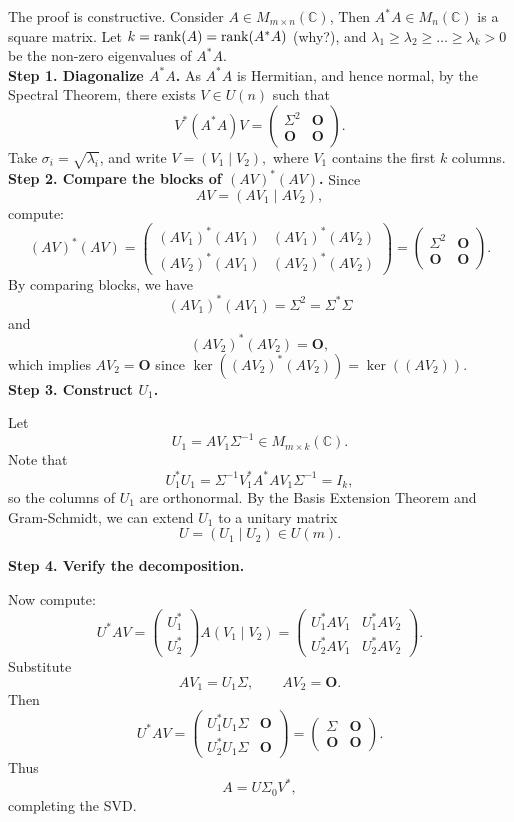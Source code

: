 \begin{pfbox}
The proof is constructive.
Consider $A\in M_{m\times n}(\mathbb{C})$,
Then $A^*A\in M_n(\mathbb{C})$ is a square matrix.
Let $k=\operatorname{rank}(A)=\operatorname{rank}(A^*A)$ (why?), 
and $\lambda_1\ge \lambda_2\ge \dots\ge \lambda_k>0$
be the non-zero eigenvalues of $A^*A$.\\

\textbf{Step 1. Diagonalize $A^*A$.}
As $A^*A$ is Hermitian, and hence normal, by the Spectral Theorem, there exists
$V\in U(n)$ such that
\[
V^*(A^*A)V
=
\begin{pmatrix}
\Sigma^2 & \mathbf{O} \\
\mathbf{O} & \mathbf{O}
\end{pmatrix}.
\]
Take $\sigma_i=\sqrt{\lambda_i}$, and write $V=(V_1\mid V_2),$
where $V_1$ contains the first $k$ columns.\\

\textbf{Step 2. Compare the blocks of $(AV)^*(AV)$.}
Since
\[
AV=(AV_1\mid AV_2),
\]
compute:
\[
(AV)^*(AV)
=
\begin{pmatrix}
(AV_1)^*(AV_1) & (AV_1)^*(AV_2) \\
(AV_2)^*(AV_1) & (AV_2)^*(AV_2)
\end{pmatrix}
=
\begin{pmatrix}
\Sigma^2 & \mathbf{O} \\
\mathbf{O} & \mathbf{O}
\end{pmatrix}.
\]
By comparing blocks, we have
\[(AV_1)^*(AV_1)=\Sigma^2 = \Sigma^*\Sigma\] 
and
\[(AV_2)^*(AV_2)=\mathbf{O},\] 
which implies $AV_2=\mathbf{O}$ since $\ker((AV_2)^*(AV_2))=\ker((AV_2))$.\\

\textbf{Step 3. Construct $U_1$.}

Let
\[
U_1=AV_1\Sigma^{-1}\in M_{m\times k}(\mathbb{C}).
\]
Note that
\[
U_1^*U_1
=
\Sigma^{-1}V_1^*A^*AV_1\Sigma^{-1}
=
I_k,
\]
so the columns of $U_1$ are orthonormal.
By the Basis Extension Theorem and Gram-Schmidt, we can extend $U_1$ to a unitary
matrix
\[
U=(U_1\mid U_2)\in U(m).
\]

\textbf{Step 4. Verify the decomposition.}

Now compute:
\[
U^*AV
=
\begin{pmatrix}
U_1^*\\
U_2^*
\end{pmatrix}
A(V_1\mid V_2)
=
\begin{pmatrix}
U_1^*AV_1 & U_1^*AV_2 \\
U_2^*AV_1 & U_2^*AV_2
\end{pmatrix}.
\]
Substitute
\[
AV_1=U_1\Sigma,
\qquad
AV_2=\mathbf{O}.
\]
Then
\[
U^*AV
=
\begin{pmatrix}
U_1^*U_1\Sigma & \mathbf{O} \\
U_2^*U_1\Sigma & \mathbf{O}
\end{pmatrix}
=
\begin{pmatrix}
\Sigma & \mathbf{O} \\
\mathbf{O} & \mathbf{O}
\end{pmatrix}.
\]
Thus
\[
A=U\Sigma_0V^*,
\]
completing the SVD.
\end{pfbox}

